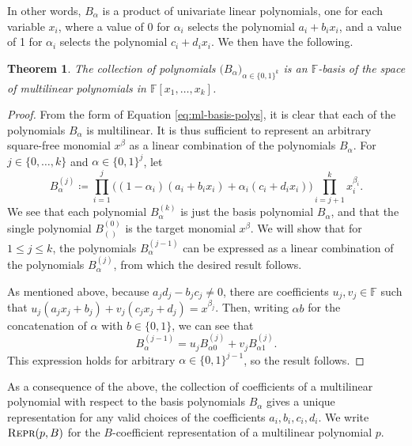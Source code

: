 \documentclass[12pt]{article}
\theoremstyle{plain}
\newcounter{documentcounter}
\newtheorem{theorem}[documentcounter]{Theorem}
\theoremstyle{definition}
\newcommand{\defeq}{\coloneqq}                %
\newcommand{\FF}{\mathbb{F}}                  %
\newcommand*{\fn}[1]{\textsc{{#1}}}
\begin{document}
In other words, $B_{\alpha}$ is a product of univariate linear polynomials, one for each variable $x_i$, where a value of 0 for $\alpha_i$ selects the polynomial $a_i + b_i x_i$, and a value of 1 for $\alpha_i$ selects the polynomial $c_i + d_i x_i$.  We then have the following.

\begin{theorem}
  The collection of polynomials $\big(B_\alpha\big)_{\alpha \in \{0, 1\}^k}$ is an $\FF$-basis of the space of multilinear polynomials in $\FF[x_1, \ldots, x_k]$.
\end{theorem}

\begin{proof}
  From the form of Equation \ref{eq:ml-basis-polys}, it is clear that each of the polynomials $B_\alpha$ is multilinear.  It is thus sufficient to represent an arbitrary square-free monomial $x^\beta$ as a linear combination of the polynomials $B_\alpha$.  For $j \in \{0, \ldots, k\}$ and $\alpha \in \{0, 1\}^j$, let
  \[
    B_\alpha^{(j)} \defeq \prod_{i=1}^j \big( (1 - \alpha_i) (a_i + b_i x_i) + \alpha_i (c_i + d_i x_i) \big) \prod_{i=j+1}^k x_i^{\beta_i}.
  \]
  We see that each polynomial $B_\alpha^{(k)}$ is just the basis polynomial $B_\alpha$, and that the single polynomial $B_{()}^{(0)}$ is the target monomial $x^\beta$.  We will show that for $1 \leq j \leq k$, the polynomials $B_\alpha^{(j-1)}$ can be expressed as a linear combination of the polynomials $B_\alpha^{(j)}$, from which the desired result follows.

  As mentioned above, because $a_j d_j - b_j c_j \neq 0$, there are coefficients $u_j, v_j \in \FF$ such that $u_j (a_j x_j + b_j) + v_j (c_j x_j + d_j) = x^{\beta_j}$.  Then, writing $\alpha b$ for the concatenation of $\alpha$ with $b \in \{0, 1\}$, we can see that
  \[
    B_\alpha^{(j-1)} = u_j B_{\alpha 0}^{(j)} + v_j B_{\alpha 1}^{(j)}.
  \]
  This expression holds for arbitrary $\alpha \in \{0, 1\}^{j-1}$, so the result follows.
\end{proof}

As a consequence of the above, the collection of coefficients of a multilinear polynomial with respect to the basis polynomials $B_\alpha$ gives a unique representation for any valid choices of the coefficients $a_i, b_i, c_i, d_i$.  We write $\fn{Repr}(p, B)$ for the $B$-coefficient representation of a multilinear polynomial $p$.
\end{document}
